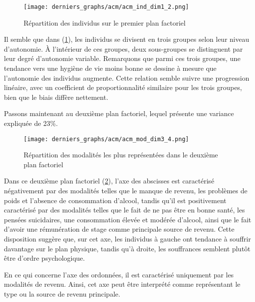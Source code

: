 \documentclass{article}
\begin{document}
\begin{figure}[H]
  \centering
  \texttt{[image: derniers\_graphs/acm/acm\_ind\_dim1\_2.png]} 
  \caption{Répartition des individus sur le premier plan factoriel}
  \label{fig:ind1}
\end{figure}

Il semble que dans (\ref{fig:ind1}), les individus se divisent en trois groupes selon leur niveau d'autonomie. À l'intérieur de ces groupes, deux sous-groupes se distinguent par leur degré d'autonomie variable. Remarquons que parmi ces trois groupes, une tendance vers une hygiène de vie moins bonne se dessine à mesure que l'autonomie des individus augmente. Cette relation semble suivre une progression linéaire, avec un coefficient de proportionnalité similaire pour les trois groupes, bien que le biais diffère nettement.

Passons maintenant au deuxième plan factoriel, lequel présente une variance expliquée de 23\%.
\begin{figure}[H]
  \centering
  \texttt{[image: derniers\_graphs/acm/acm\_mod\_dim3\_4.png]} 
  \caption{Répartition des modalités les plus représentées dans le deuxième plan factoriel}
  \label{fig:acm2}
\end{figure}

Dans ce deuxième plan factoriel (\ref{fig:acm2}), l'axe des abscisses est caractérisé négativement par des modalités telles que le manque de revenu, les problèmes de poids et l'absence de consommation d'alcool, tandis qu'il est positivement caractérisé par des modalités telles que le fait de ne pas être en bonne santé, les pensées suicidaires, une consommation élevée et modérée d'alcool, ainsi que le fait d'avoir une rémunération de stage comme principale source de revenu. Cette disposition suggère que, sur cet axe, les individus à gauche ont tendance à souffrir davantage sur le plan physique, tandis qu'à droite, les souffrances semblent plutôt être d'ordre psychologique.

En ce qui concerne l'axe des ordonnées, il est caractérisé uniquement par les modalités de revenu. Ainsi, cet axe peut être interprété comme représentant le type ou la source de revenu principale.
\end{document}
